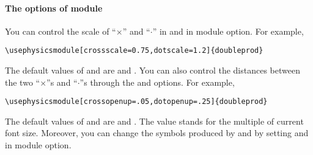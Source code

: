 \documentclass[11pt,letterpaper]{article}
\begin{document}
\paragraph{The options of  module}
You can control the scale of ``$\times$'' and ``$\cdot$'' in 
and  in module option. For example,
\begin{Verbatim}
\usephysicsmodule[crossscale=0.75,dotscale=1.2]{doubleprod}
\end{Verbatim}
The default values of  and  are  and
. You can also control the distances between the two ``$\times$''s and
``$\cdot$''s through the  and  options.
For example,
\begin{Verbatim}
\usephysicsmodule[crossopenup=.05,dotopenup=.25]{doubleprod}
\end{Verbatim}
The default values of  and  are 
and . The value stands for the multiple of current font size.
Moreover, you can change the symbols produced by  and
 by setting  and  in module
option.
\end{document}
